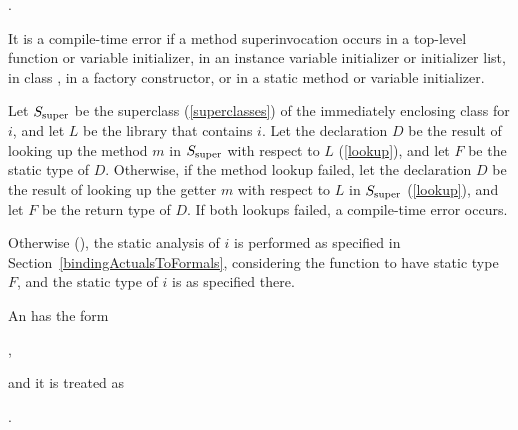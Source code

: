 \documentclass[makeidx]{article}
\begin{document}
{\noindent
{}.


\LMHash{}%
It is a compile-time error if a method superinvocation occurs
in a top-level function or variable initializer,
in an instance variable initializer or initializer list,
in class ,
in a factory constructor,
or in a static method or variable initializer.

{ %

\def\SuperClass{\ensuremath{S_{\mbox{\scriptsize{}super}}}}

\LMHash{}%
\BlindDefineSymbol{\SuperClass, L}%
Let \SuperClass{} be the superclass (\ref{superclasses})
of the immediately enclosing class for $i$,
%
and let $L$ be the library that contains $i$.
Let the declaration $D$ be
the result of looking up the method $m$ in \SuperClass{}
with respect to $L$ (\ref{lookup}),
and let $F$ be the static type of $D$.
Otherwise, if the method lookup failed,
let the declaration $D$ be the result of looking up
the getter $m$ with respect to $L$ in \SuperClass{}
(\ref{lookup}),
and let $F$ be the return type of $D$.
If both lookups failed, a compile-time error occurs.

\LMHash{}%
Otherwise (),
the static analysis of $i$ is performed
as specified in Section~\ref{bindingActualsToFormals},
considering the function to have static type $F$,
and the static type of $i$ is as specified there.


\LMHash{}%
An
has the form

\noindent
{},

\noindent
and it is treated as

\noindent
{}.

}}
\end{document}
